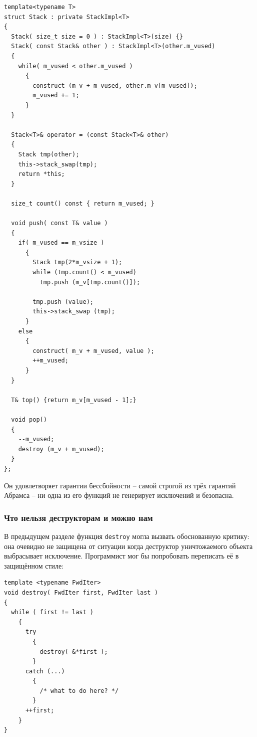 \documentclass[a4paper,12pt,oneside]{article}
\begin{document}
\begin{lstlisting}
template<typename T> 
struct Stack : private StackImpl<T>
{
  Stack( size_t size = 0 ) : StackImpl<T>(size) {}
  Stack( const Stack& other ) : StackImpl<T>(other.m_vused)
  {
    while( m_vused < other.m_vused )
      {
        construct (m_v + m_vused, other.m_v[m_vused]);
        m_vused += 1;
      }
  }

  Stack<T>& operator = (const Stack<T>& other)
  {
    Stack tmp(other);
    this->stack_swap(tmp);
    return *this;
  }
 
  size_t count() const { return m_vused; }

  void push( const T& value )
  {
    if( m_vused == m_vsize )
      {
        Stack tmp(2*m_vsize + 1);
        while (tmp.count() < m_vused)
          tmp.push (m_v[tmp.count()]);

        tmp.push (value);
        this->stack_swap (tmp);
      }
    else
      {
        construct( m_v + m_vused, value );
        ++m_vused;
      }
  }

  T& top() {return m_v[m_vused - 1];}

  void pop()
  {
    --m_vused;
    destroy (m_v + m_vused);
  }
};
\end{lstlisting}

Он удовлетворяет гарантии бессбойности -- самой строгой из трёх гарантий Абрамса -- ни одна из его функций не генерирует исключений и безопасна.

\subsubsection{Что нельзя деструкторам и можно нам}\label{ExcDestructors}

В предыдущем разделе функция \lstinline!destroy! могла вызвать обоснованную критику: она очевидно не защищена от ситуации когда деструктор уничтожаемого объекта выбрасывает исключение. Программист мог бы попробовать переписать её в защищённом стиле:

\begin{lstlisting}
template <typename FwdIter>
void destroy( FwdIter first, FwdIter last )
{
  while ( first != last )
    {
      try 
        {
          destroy( &*first ); 
        }
      catch (...)
        {
          /* what to do here? */
        }
      ++first;
    }
}
\end{lstlisting}
\end{document}
